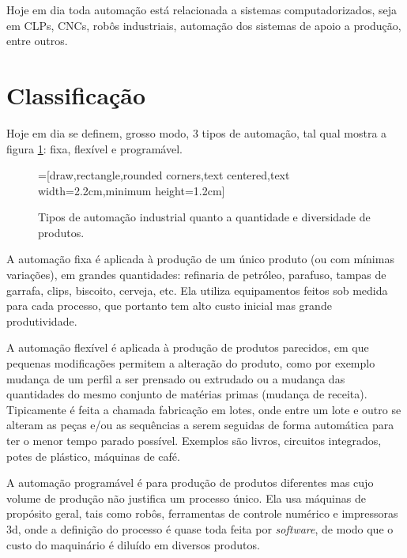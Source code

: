 Hoje em dia toda automação está relacionada a sistemas computadorizados, seja em CLPs, CNCs, robôs industriais, automação dos sistemas de apoio a produção, entre outros.

\section{Classificação}

Hoje em dia se definem, grosso modo, 3 tipos de automação, tal qual mostra a figura \ref{fig:tipos_automacao}: fixa, flexível e programável.
\begin{figure}[hbt]
	\begin{center}
	=[draw,rectangle,rounded corners,text centered,text width=2.2cm,minimum height=1.2cm]
	\end{center}
	\caption{Tipos de automação industrial quanto a quantidade e diversidade de produtos.}
	\label{fig:tipos_automacao}
\end{figure}

A automação fixa é aplicada à produção de um único produto (ou com mínimas variações), em grandes quantidades: refinaria de petróleo, parafuso, tampas de garrafa, clips, biscoito, cerveja, etc. Ela utiliza equipamentos feitos sob medida para cada processo, que portanto tem alto custo inicial mas grande produtividade.

A automação flexível é aplicada à produção de produtos parecidos, em que pequenas modificações permitem a alteração do produto, como por exemplo mudança de um perfil a ser prensado ou extrudado ou a mudança das quantidades do mesmo conjunto de matérias primas (mudança de receita). Tipicamente é feita a chamada fabricação em lotes, onde entre um lote e outro se alteram as peças e/ou as sequências a serem seguidas de forma automática para ter o menor tempo parado possível. Exemplos são livros, circuitos integrados, potes de plástico, máquinas de café.

A automação programável é para produção de produtos diferentes mas cujo volume de produção não justifica um processo único. Ela usa máquinas de propósito geral, tais como robôs, ferramentas de controle numérico e impressoras 3d, onde a definição do processo é quase toda feita por \emph{software}, de modo que o custo do maquinário é diluído em diversos produtos.

